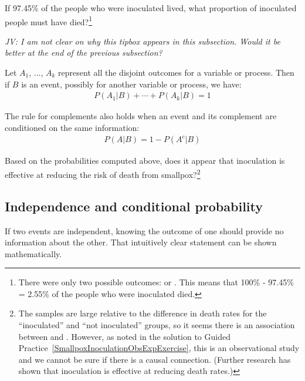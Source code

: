 \begin{exercise}
If 97.45\% of the people who were inoculated lived, what proportion of inoculated people must have died?\footnote{There were only two possible outcomes:  or . This means that 100\% - 97.45\% = 2.55\% of the people who were inoculated died.}
\end{exercise}

\textit{JV: I am not clear on why this tipbox appears in this subsection. Would it be better at the end of the previous subsection?}

\begin{termBox}{
Let $A_1$, ..., $A_k$ represent all the disjoint outcomes for a variable or process. Then if $B$ is an event, possibly for another variable or process, we have: \vspace{-1mm}
\begin{eqnarray*}
P(A_1|B)+\cdots+P(A_k|B) = 1
\end{eqnarray*}\vspace{-5.5mm} \par
The rule for complements also holds when an event and its complement are conditioned on the same information: \vspace{-1.5mm}
\begin{eqnarray*}
P(A | B) = 1 - P(A^c | B)
\end{eqnarray*}}
\end{termBox}

\begin{exercise}
Based on the probabilities computed above, does it appear that inoculation is effective at reducing the risk of death from smallpox?\footnote{The samples are large relative to the difference in death rates for the ``inoculated'' and ``not inoculated'' groups, so it seems there is an association between  and . However, as noted in the solution to Guided Practice~\ref{SmallpoxInoculationObsExpExercise}, this is an observational study and we cannot be sure if there is a causal connection. (Further research has shown that inoculation is effective at reducing death rates.)}
\end{exercise}


\subsection{Independence and conditional probability}

If two events are independent, knowing the outcome of one should provide no information about the other.  That intuitively clear statement can be shown mathematically. 

